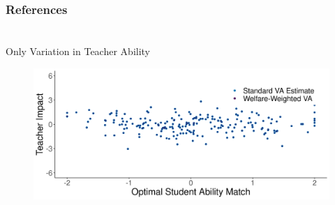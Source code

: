 \documentclass[11pt]{beamer}
\begin{document}

\section*{}


\begin{frame}[noframenumbering, shrink=10]
    \frametitle{References}
    
\end{frame}







\section*{}
\begin{frame}[noframenumbering]{Only Variation in Teacher Ability}

\hypertarget{st_cent1}{}
\vfill

\begin{figure}
    \centering
 \includegraphics[width=.75\textwidth]{slides/Figures/standard_est_cent_run_1.png}
\end{figure}

\hyperlink{teacher_ability1}{}

\end{frame}


\end{document}
